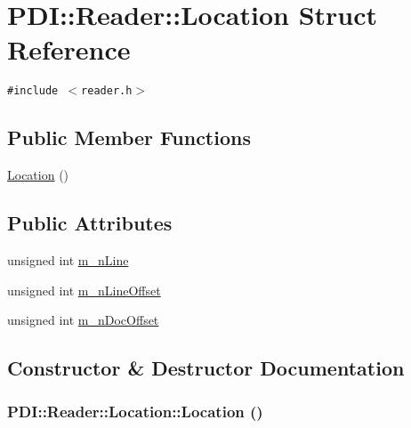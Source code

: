 \hypertarget{struct_p_d_i_1_1_reader_1_1_location}{
\section{PDI::Reader::Location Struct Reference}
\label{struct_p_d_i_1_1_reader_1_1_location}
}
{\tt \#include $<$reader.h$>$}

\subsection*{Public Member Functions}
\begin{CompactItemize}
\item 
\hyperlink{struct_p_d_i_1_1_reader_1_1_location_c44d90358a728fb97c3d6a1fc7122389}{Location} ()
\end{CompactItemize}
\subsection*{Public Attributes}
\begin{CompactItemize}
\item 
unsigned int \hyperlink{struct_p_d_i_1_1_reader_1_1_location_1b8a831608aa150afbc0c497c889f820}{m\_\-nLine}
\item 
unsigned int \hyperlink{struct_p_d_i_1_1_reader_1_1_location_3b4e677a48b5d935168ba35a94475e77}{m\_\-nLineOffset}
\item 
unsigned int \hyperlink{struct_p_d_i_1_1_reader_1_1_location_5c2e66e60aa0683da75aeeccef81b549}{m\_\-nDocOffset}
\end{CompactItemize}


\subsection{Constructor \& Destructor Documentation}
\hypertarget{struct_p_d_i_1_1_reader_1_1_location_c44d90358a728fb97c3d6a1fc7122389}{
\subsubsection[{Location}]{\setlength{\rightskip}{0pt plus 5cm}PDI::Reader::Location::Location ()}}
\label{struct_p_d_i_1_1_reader_1_1_location_c44d90358a728fb97c3d6a1fc7122389}




